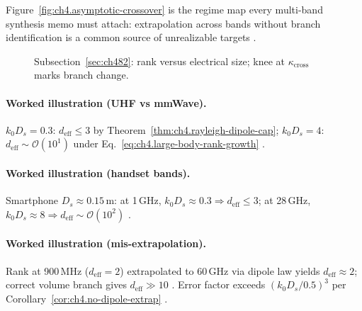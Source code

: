 Figure~\ref{fig:ch4.asymptotic-crossover} is the regime map every multi-band synthesis memo must attach: extrapolation across bands without branch
identification is a common source of unrealizable targets \cite{jackson1999,harrington2001,stratton1941}.

\begin{figure}[t]
\centering
{}
\caption{Subsection~\ref{sec:ch482}: rank versus electrical size; knee at \(\kappa_{\mathrm{cross}}\) marks branch change.}
\label{fig:ch4.rank-vs-kds}
\end{figure}

\paragraph{Worked illustration (UHF vs mmWave).}
\(k_{0}D_{s}=0.3\): \(d_{\mathrm{eff}}\le3\) by Theorem~\ref{thm:ch4.rayleigh-dipole-cap}; \(k_{0}D_{s}=4\): \(d_{\mathrm{eff}}\sim\mathcal{O}(10^{1})\)
under Eq.~\eqref{eq:ch4.large-body-rank-growth} \cite{jackson1999,harrington2001,collin2001}.

\paragraph{Worked illustration (handset bands).}
Smartphone \(D_{s}\approx0.15\,\mathrm{m}\): at 1\,GHz, \(k_{0}D_{s}\approx0.3\Rightarrow d_{\mathrm{eff}}\le3\); at 28\,GHz,
\(k_{0}D_{s}\approx8\Rightarrow d_{\mathrm{eff}}\sim\mathcal{O}(10^{2})\) \cite{jackson1999,harrington2001,collin2001,hansen1988}.

\paragraph{Worked illustration (mis-extrapolation).}
Rank at 900\,MHz (\(d_{\mathrm{eff}}=2\)) extrapolated to 60\,GHz via dipole law yields \(d_{\mathrm{eff}}\approx2\); correct volume branch gives
\(d_{\mathrm{eff}}\gg10\) \cite{hansen1988,devaney2004,stratton1941}. Error factor exceeds \((k_{0}D_{s}/0.5)^{3}\) per
Corollary~\ref{cor:ch4.no-dipole-extrap} \cite{jackson1999,harrington2001}.

